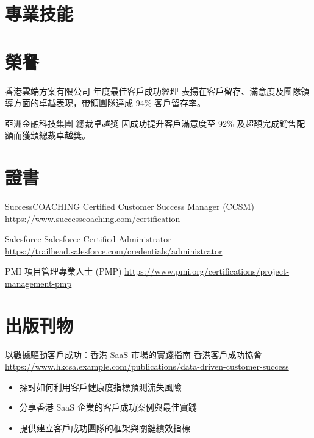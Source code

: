 \documentclass[a4paper, serif, 10pt]{moderncv}
\begin{document}
\section{專業技能}

\section{榮譽}

        {香港雲端方案有限公司}
        {年度最佳客戶成功經理}
        {}
        {}
        {表揚在客戶留存、滿意度及團隊領導方面的卓越表現，帶領團隊達成 94\% 客戶留存率。}

        {亞洲金融科技集團}
        {總裁卓越獎}
        {}
        {}
        {因成功提升客戶滿意度至 92\% 及超額完成銷售配額而獲頒總裁卓越獎。}
\section{證書}

        {SuccessCOACHING}
        {Certified Customer Success Manager (CCSM)}
        {\url{https://www.successcoaching.com/certification}}
        {}
        {}

        {Salesforce}
        {Salesforce Certified Administrator}
        {\url{https://trailhead.salesforce.com/credentials/administrator}}
        {}
        {}

        {PMI}
        {項目管理專業人士 (PMP)}
        {\url{https://www.pmi.org/certifications/project-management-pmp}}
        {}
        {}
\section{出版刊物}

        {以數據驅動客戶成功：香港 SaaS 市場的實踐指南}
        {香港客戶成功協會}
        {\url{https://www.hkcsa.example.com/publications/data-driven-customer-success}}
        {}
        {\begin{itemize}
\item 探討如何利用客戶健康度指標預測流失風險
\item 分享香港 SaaS 企業的客戶成功案例與最佳實踐
\item 提供建立客戶成功團隊的框架與關鍵績效指標
\end{itemize}}
\end{document}
